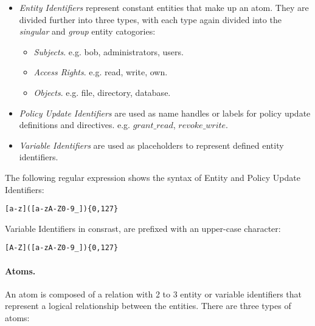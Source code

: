 \documentclass{llncs}
\begin{document}
          \begin{itemize}
            \item
              {\em Entity Identifiers} represent constant entities that make
              up an atom. They are divided further into three types, with each
              type again divided into the {\em singular} and {\em group} entity
              catogories:
 
              \begin{itemize}
                \item {\em Subjects}. e.g. bob, administrators, users.
 
                \item {\em Access Rights}. e.g. read, write, own.
 
                \item {\em Objects}. e.g. file, directory, database.
              \end{itemize}
 
            \item
              {\em Policy Update Identifiers} are used as name handles or
              labels for policy update definitions and directives. e.g.
              $grant\_read$, $revoke\_write$.
 
            \item
              {\em Variable Identifiers} are used as placeholders to represent
              defined entity identifiers.
          \end{itemize}
 
          The following regular expression shows the syntax of Entity and
          Policy Update Identifiers:
 
          \begin{verbatim}[a-z]([a-zA-Z0-9_]){0,127}\end{verbatim}
 
          Variable Identifiers in consrast, are prefixed with an upper-case
          character:
 
          \begin{verbatim}[A-Z]([a-zA-Z0-9_]){0,127}\end{verbatim}

        \paragraph{Atoms.}
          An atom is composed of a relation with 2 to 3 entity or variable
          identifiers that represent a logical relationship between the
          entities. There are three types of atoms:
\end{document}
